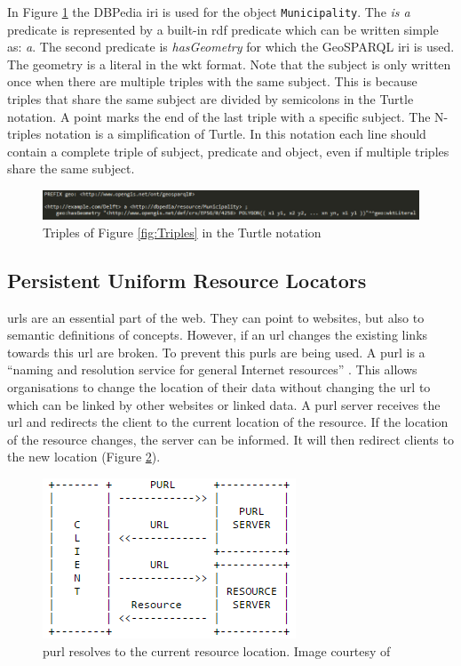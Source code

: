 In Figure \ref{fig:Turtle} the DBPedia \ac{iri} is used for the object \texttt{Municipality}. The \textit{is a} predicate is represented by a built-in \ac{rdf} predicate which can be written simple as: \textit{a}. The second predicate is \textit{hasGeometry} for which the GeoSPARQL \ac{iri} is used. The geometry is a literal in the \ac{wkt} format. Note that the subject is only written once when there are multiple triples with the same subject. This is because triples that share the same subject are divided by semicolons in the Turtle notation. A point marks the end of the last triple with a specific subject. The N-triples notation is a simplification of Turtle. In this notation each line should contain a complete triple of subject, predicate and object, even if multiple triples share the same subject. 

\begin{figure}
	\centering
	\includegraphics[width=1\linewidth]{figs/Turtle.png}
	\caption{Triples of Figure \ref{fig:Triples} in the Turtle notation}
	\label{fig:Turtle}
\end{figure} 

\subsection{Persistent Uniform Resource Locators}
\label{par:purl}
\acp{url} are an essential part of the web. They can point to websites, but also to semantic definitions of concepts. However, if an \ac{url} changes the existing links towards this \ac{url} are broken. To prevent this \aclp{purl} are being used. A \acf{purl} is a \enquote{naming and resolution service for general Internet resources} \citep{LD:PURL}. This allows organisations to change the location of their data without changing the \ac{url} to which can be linked by other websites or linked data. A \ac{purl} server receives the \ac{url} and redirects the client to the current location of the resource. If the location of the resource 
changes, the server can be informed. It will then redirect clients to the new location (Figure \ref{fig:PURL}).  

\begin{figure}
	\centering
	\includegraphics[width=0.6\linewidth]{figs/purl.png}
	\caption{\acf*{purl} resolves to the current resource location. Image courtesy of \cite{LD:PURL}}
	\label{fig:PURL}
\end{figure} 


